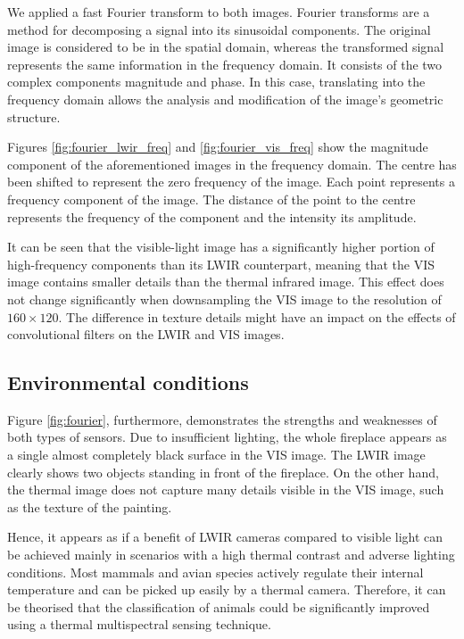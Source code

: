 \documentclass{l4proj}
\begin{document}
We applied a fast Fourier transform \citep{cooley_fast_1969} to both images. Fourier transforms are a method for decomposing a signal into its sinusoidal components. The original image is considered to be in the spatial domain, whereas the transformed signal represents the same information in the frequency domain. It consists of the two complex components magnitude and phase. In this case, translating into the frequency domain allows the analysis and modification of the image's geometric structure. 

Figures \ref{fig:fourier_lwir_freq} and \ref{fig:fourier_vis_freq} show the magnitude component of the aforementioned images in the frequency domain. The centre has been shifted to represent the zero frequency of the image. Each point represents a frequency component of the image. The distance of the point to the centre represents the frequency of the component and the intensity its amplitude. 

It can be seen that the visible-light image has a significantly higher portion of high-frequency components than its LWIR counterpart, meaning that the VIS image contains smaller details than the thermal infrared image. This effect does not change significantly when downsampling the VIS image to the resolution of $160 \times 120$. The difference in texture details might have an impact on the effects of convolutional filters on the LWIR and VIS images.

\subsection{Environmental conditions}

Figure \ref{fig:fourier}, furthermore, demonstrates the strengths and weaknesses of both types of sensors. Due to insufficient lighting, the whole fireplace appears as a single almost completely black surface in the VIS image. The LWIR image clearly shows two objects standing in front of the fireplace. On the other hand, the thermal image does not capture many details visible in the VIS image, such as the texture of the painting.

Hence, it appears as if a benefit of LWIR cameras compared to visible light can be achieved mainly in scenarios with a high thermal contrast and adverse lighting conditions. Most mammals and avian species actively regulate their internal temperature \citep{prinzinger_body_1991} and can be picked up easily by a thermal camera. Therefore, it can be theorised that the classification of animals could be significantly improved using a thermal multispectral sensing technique.
\end{document}
